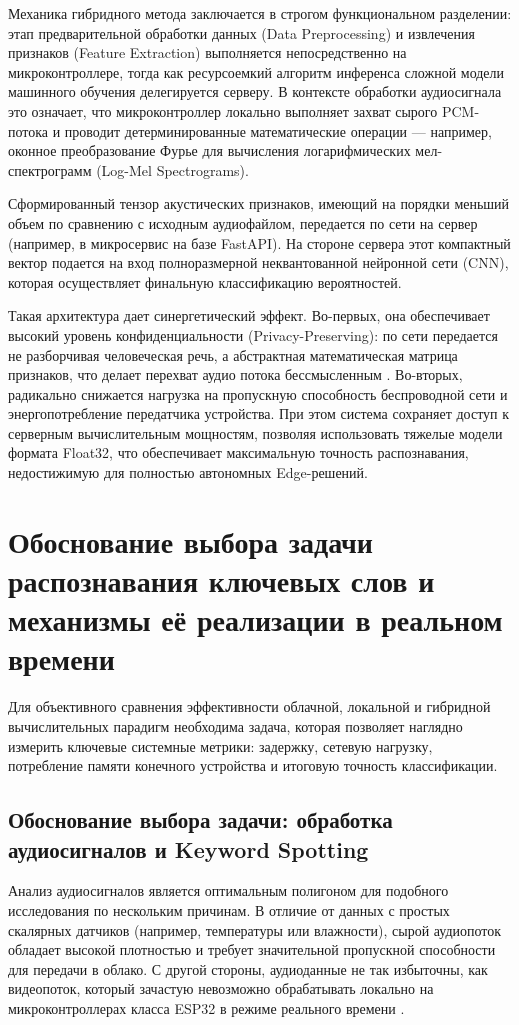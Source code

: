 Механика гибридного метода заключается в строгом функциональном разделении: этап предварительной обработки данных (Data Preprocessing) и извлечения признаков (Feature Extraction) выполняется непосредственно на микроконтроллере, тогда как ресурсоемкий алгоритм инференса сложной модели машинного обучения делегируется серверу. В контексте обработки аудиосигнала это означает, что микроконтроллер локально выполняет захват сырого PCM-потока и проводит детерминированные математические операции — например, оконное преобразование Фурье для вычисления логарифмических мел-спектрограмм (Log-Mel Spectrograms). 

Сформированный тензор акустических признаков, имеющий на порядки меньший объем по сравнению с исходным аудиофайлом, передается по сети на сервер (например, в микросервис на базе FastAPI). На стороне сервера этот компактный вектор подается на вход полноразмерной неквантованной нейронной сети (CNN), которая осуществляет финальную классификацию вероятностей.

Такая архитектура дает синергетический эффект. Во-первых, она обеспечивает высокий уровень конфиденциальности (Privacy-Preserving): по сети передается не разборчивая человеческая речь, а абстрактная математическая матрица признаков, что делает перехват аудио потока бессмысленным \cite{Srinivas2025}. Во-вторых, радикально снижается нагрузка на пропускную способность беспроводной сети и энергопотребление передатчика устройства. При этом система сохраняет доступ к серверным вычислительным мощностям, позволяя использовать тяжелые модели формата Float32, что обеспечивает максимальную точность распознавания, недостижимую для полностью автономных Edge-решений.

\section{Обоснование выбора задачи распознавания ключевых слов и механизмы её реализации в реальном времени}

Для объективного сравнения эффективности облачной, локальной и гибридной вычислительных парадигм необходима задача, которая позволяет наглядно измерить ключевые системные метрики: задержку, сетевую нагрузку, потребление памяти конечного устройства и итоговую точность классификации.

\subsection{Обоснование выбора задачи: обработка аудиосигналов и Keyword Spotting}
Анализ аудиосигналов является оптимальным полигоном для подобного исследования по нескольким причинам. В отличие от данных с простых скалярных датчиков (например, температуры или влажности), сырой аудиопоток обладает высокой плотностью и требует значительной пропускной способности для передачи в облако. С другой стороны, аудиоданные не так избыточны, как видеопоток, который зачастую невозможно обрабатывать локально на микроконтроллерах класса ESP32 в режиме реального времени \cite{Swamy2020, Nowroz}.

